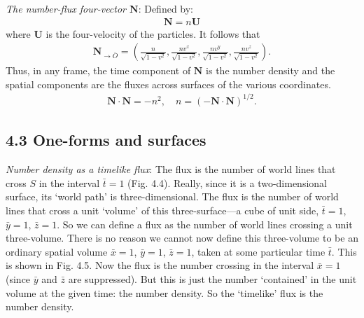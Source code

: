 \documentclass[11pt,letterpaper]{book}
\begin{document}
    \textit{The number-flux four-vector $\mathbf{N}$}: 
    Defined by:
    \begin{align}
        \mathbf{N}=n\mathbf{U} \tag{4.4}
    \end{align}
    where \(\mathbf{U}\) is the four-velocity of the particles. It follows that
    \begin{align}
    \mathbf{N}_{\rightarrow \bar{O}} =
    \left(
    \frac{n}{\sqrt{1 - v^2}},
    \frac{n v^x}{\sqrt{1 - v^2}},
    \frac{n v^y}{\sqrt{1 - v^2}},
    \frac{n v^z}{\sqrt{1 - v^2}}
    \right).
    \tag{4.5}
    \end{align}
    Thus, in any frame, the time component of $\mathbf{N}$ is the number density and the spatial components are the fluxes across surfaces of the various coordinates.
    \begin{align}
    \mathbf{N} \cdot \mathbf{N} = -n^2, \quad n = \left(-\mathbf{N} \cdot \mathbf{N}\right)^{1/2}.     \tag{4.6}
    \end{align}

    \subsection{4.3 One-forms and surfaces}

    \textit{Number density as a timelike flux}: 
    The flux is the number of world lines that cross \(S\) in the interval \(\bar{t} = 1\) (Fig. 4.4). Really, since it is a two-dimensional surface, its ‘world path’ is three-dimensional. The flux is the number of world lines that cross a unit ‘volume’ of this three-surface—a cube of unit side, \(\bar{t} = 1\), \(\bar{y} = 1\), \(\bar{z} = 1\). So we can define a flux as the number of world lines crossing a unit three-volume. There is no reason we cannot now define this three-volume to be an ordinary spatial volume \(\bar{x} = 1\), \(\bar{y} = 1\), \(\bar{z} = 1\), taken at some particular time \(\bar{t}\). This is shown in Fig. 4.5. Now the flux is the number crossing in the interval \(\bar{x} = 1\) (since \(\bar{y}\) and \(\bar{z}\) are suppressed). But this is just the number ‘contained’ in the unit volume at the given time: the number density. So the ‘timelike’ flux is the number density.
\end{document}
